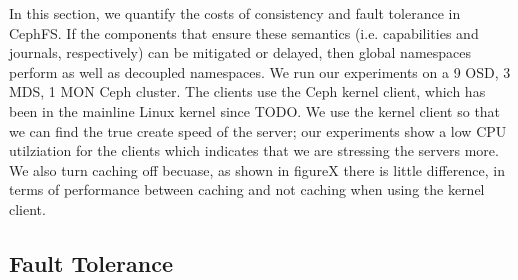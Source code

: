 In this section, we quantify the costs of consistency and fault tolerance in
CephFS. If the components that ensure these semantics (i.e. capabilities and
journals, respectively) can be mitigated or delayed, then global namespaces
perform as well as decoupled namespaces. We run our experiments on a 9 OSD, 3
MDS, 1 MON Ceph cluster. The clients use the Ceph kernel client, which has been
in the mainline Linux kernel since TODO. We use the kernel client so that we
can find the true create speed of the server; our experiments show a low CPU
utilziation for the clients which indicates that we are stressing the servers
more. We also turn caching off becuase, as shown in figureX there is little
difference, in terms of performance between caching and not caching when using
the kernel client.

\subsection{Fault Tolerance}
\label{sec:fault-tolerance}

